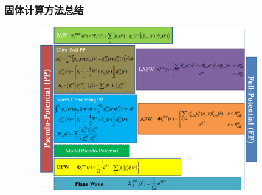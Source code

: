 \frame
{
	\frametitle{固体计算方法总结}
\begin{figure}[h!]
\centering
\vspace*{-0.25in}
\includegraphics[height=2.80in,width=4.10in,viewport=0 0 1190 876,clip]{Figures/Pseudo-Full_Potential.png}
\label{Pseudo-Full_Poential}
\end{figure}
}


